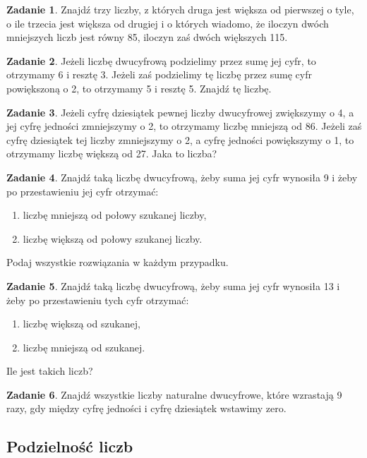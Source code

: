 \documentclass[11pt]{article}
\theoremstyle{definition}
\newtheorem{zad}{Zadanie}
\begin{document}
\begin{zad}
Znajdź trzy liczby, z których druga jest większa od pierwszej o tyle, o ile trzecia jest większa od drugiej i o których wiadomo, że iloczyn dwóch mniejszych liczb jest równy 85, iloczyn zaś dwóch większych 115.
\end{zad}

\begin{zad}
Jeżeli liczbę dwucyfrową podzielimy przez sumę jej cyfr, to otrzymamy 6 i resztę 3. Jeżeli zaś podzielimy tę liczbę przez sumę cyfr powiększoną o 2, to otrzymamy 5 i resztę 5. Znajdź tę liczbę.
\end{zad}

\begin{zad}
Jeżeli cyfrę dziesiątek pewnej liczby dwucyfrowej zwiększymy o 4, a jej cyfrę jedności zmniejszymy o 2, to otrzymamy liczbę mniejszą od 86. Jeżeli zaś cyfrę dziesiątek tej liczby zmniejszymy o 2, a cyfrę jedności powiększymy o 1, to otrzymamy liczbę większą od 27. Jaka to liczba?
\end{zad}

\begin{zad}
Znajdź taką liczbę dwucyfrową, żeby suma jej cyfr wynosiła 9 i żeby po przestawieniu jej cyfr otrzymać:
\begin{enumerate}
\item liczbę mniejszą od połowy szukanej liczby,
\item liczbę większą od połowy szukanej liczby.
\end{enumerate}
Podaj wszystkie rozwiązania w każdym przypadku.
\end{zad}

\begin{zad}
Znajdź taką liczbę dwucyfrową, żeby suma jej cyfr wynosiła 13 i żeby po przestawieniu tych cyfr otrzymać:
\begin{enumerate}
\item liczbę większą od szukanej,
\item liczbę mniejszą od szukanej.
\end{enumerate}
Ile jest takich liczb?
\end{zad}

\begin{zad}
Znajdź wszystkie liczby naturalne dwucyfrowe, które wzrastają 9 razy, gdy między cyfrę jedności i cyfrę dziesiątek wstawimy zero.
\end{zad}

\subsection{Podzielność liczb}
\end{document}
